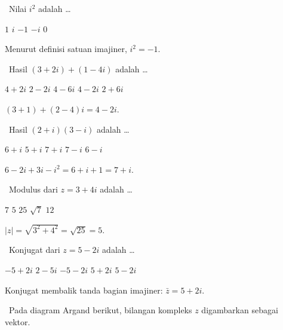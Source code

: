 \documentclass[11pt,a4paper]{exam}
\newcommand{\Fund}{{\footnotesize\textsf{\textcolor{hijau}{[Fundamental]}}}\ }
\newcommand{\Inter}{{\footnotesize\textsf{\textcolor{biru}{[Intermediate]}}}\ }
\newcommand{\Adv}{{\footnotesize\textsf{\textcolor{oranye}{[Advanced]}}}\ }
\begin{document}
\begin{questions}

\question \Fund Nilai $i^{2}$ adalah \dots
\begin{choices}
\choice $1$ \choice $i$ \CorrectChoice $-1$ \choice $-i$ \choice $0$
\end{choices}
\begin{solution}Menurut definisi satuan imajiner, $i^{2} = -1.$\end{solution}

\question \Fund Hasil $(3+2i)+(1-4i)$ adalah \dots
\begin{choices}
\choice $4+2i$ \choice $2-2i$ \choice $4-6i$ \CorrectChoice $4-2i$ \choice $2+6i$
\end{choices}
\begin{solution}$(3+1)+(2-4)i = 4 - 2i.$\end{solution}

\question \Inter Hasil $(2+i)(3-i)$ adalah \dots
\begin{choices}
\choice $6+i$ \choice $5+i$ \CorrectChoice $7+i$ \choice $7-i$ \choice $6-i$
\end{choices}
\begin{solution}$6-2i+3i-i^{2} = 6+i+1 = 7+i.$\end{solution}

\question \Inter Modulus dari $z = 3+4i$ adalah \dots
\begin{choices}
\choice $7$ \CorrectChoice $5$ \choice $25$ \choice $\sqrt{7}$ \choice $12$
\end{choices}
\begin{solution}$|z| = \sqrt{3^{2}+4^{2}} = \sqrt{25} = 5.$\end{solution}

\question \Inter Konjugat dari $z = 5-2i$ adalah \dots
\begin{choices}
\choice $-5+2i$ \choice $2-5i$ \choice $-5-2i$ \CorrectChoice $5+2i$ \choice $5-2i$
\end{choices}
\begin{solution}Konjugat membalik tanda bagian imajiner: $\bar z = 5+2i.$\end{solution}

\question \Adv Pada diagram Argand berikut, bilangan kompleks $z$ digambarkan
sebagai vektor.

\begin{center}
\end{center}


\end{questions}
\end{document}
